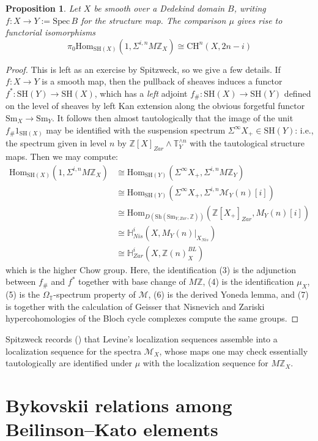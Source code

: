 \documentclass[a4paper,reqno,11pt]{amsart}
\theoremstyle{plain}
\newtheorem{proposition}[theorem]{Proposition}
\theoremstyle{definition}
\theoremstyle{remark}
\newcommand{\Sh}{{\mathrm{Sh}}}
\newcommand{\Sm}{{\mathrm{Sm}}}
\newcommand{\CH}{{\mathrm{CH}}}
\newcommand{\Z}{\mathbb{Z}}
\newcommand{\T}{\mathbb{T}}
\newcommand{\SH}{\mathrm{SH}}
\newcommand{\Hom}{\mathrm{Hom}}
\begin{document}
\begin{proposition} \label{prop:comparison}
    Let $X$ be smooth over a Dedekind domain $B$, writing $f:X\to Y:=\mathrm{Spec }\,B$ for the structure map. The comparison $\mu$ gives rise to functorial isomorphisms
    \[
        \pi_0\Hom_{\SH(X)}(1, \Sigma^{i,n}M\Z_X) \cong \CH^{n}(X, 2n-i)
    \]
\end{proposition}
\begin{proof}
    This is left as an exercise by Spitzweck, so we give a few details. If $f:X\to Y$ is a smooth map, then the pullback of sheaves induces a functor $f^*:\SH(Y)\to \SH(X)$, which has a \emph{left} adjoint $f_\#:\SH(X) \to \SH(Y)$ defined on the level of sheaves by left Kan extension along the obvious forgetful functor $\Sm_X\to \Sm_Y$. It follows then almost tautologically that the image of the unit $f_{\#}1_{\SH(X)}$ may be identified with the suspension spectrum $\Sigma^\infty X_+\in \SH(Y)$: i.e., the spectrum given in level $n$ by $\Z[X]_{Zar} \wedge \T_Y^{\wedge n}$ with the tautological structure maps. Then we may compute:
    \begin{align}
        \Hom_{\SH(X)}(1, \Sigma^{i,n}M\Z_X) &\cong \Hom_{\SH(Y)}(\Sigma^\infty X_+, \Sigma^{i,n}M\Z_Y) 
        \\&\cong \Hom_{\SH(Y)}(\Sigma^\infty X_+, \Sigma^{i,n} \mathcal{M}_Y(n)[i]) \\&\cong \Hom_{D(\Sh(\Sm_{Y,Zar},\Z))}( \Z[X_+]_{Zar},  M_Y(n)[i])\\& \cong \mathbb{H}^i_{Nis}(X,M_Y(n)|_{X_{Nis}}) \\&\cong \mathbb{H}^i_{Zar}(X,\Z(n)_X^{BL})
    \end{align}
    which is the higher Chow group. Here, the identification (3) is the adjunction between $f_\#$ and $f^*$ together with base change of $M\Z$, (4) is the identification $\mu_X$, (5) is the $\Omega_\T$-spectrum property of $\mathcal{M}$, (6) is the derived Yoneda lemma, and (7) is \cite[Corollary 5.20]{Sp} together with the calculation of Geisser \cite[Proposition 3.6]{G} that Nisnevich and Zariski hypercohomologies of the Bloch cycle complexes compute the same groups.
\end{proof}

Spitzweck records (\cite[Theorem 3.1]{Sp}) that Levine's localization sequences assemble into a localization sequence for the spectra $\mathcal{M}_X$, whose maps one may check essentially tautologically are identified under $\mu$ with the localization sequence for $M\Z_X$.

\section{Bykovskii relations among Beilinson--Kato elements}
\end{document}
